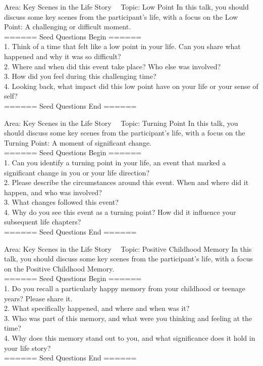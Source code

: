 \begin{mybox}{Area: Key Scenes in the Life Story \ \ Topic: Low Point}
In this talk, you should discuss some key scenes from the participant's life, with a focus on the Low Point: A challenging or difficult moment. \\
====== Seed Questions Begin ====== \\
1. Think of a time that felt like a low point in your life. Can you share what happened and why it was so difficult? \\
2. Where and when did this event take place? Who else was involved? \\
3. How did you feel during this challenging time? \\
4. Looking back, what impact did this low point have on your life or your sense of self? \\
====== Seed Questions End ====== \\
\end{mybox}

\begin{mybox}{Area: Key Scenes in the Life Story \ \ Topic: Turning Point}
In this talk, you should discuss some key scenes from the participant's life, with a focus on the Turning Point: A moment of significant change. \\
====== Seed Questions Begin ====== \\
1. Can you identify a turning point in your life, an event that marked a significant change in you or your life direction? \\
2. Please describe the circumstances around this event. When and where did it happen, and who was involved? \\
3. What changes followed this event? \\
4. Why do you see this event as a turning point? How did it influence your subsequent life chapters? \\
====== Seed Questions End ====== \\
\end{mybox}

\begin{mybox}{Area: Key Scenes in the Life Story \ \ Topic: Positive Childhood Memory}
In this talk, you should discuss some key scenes from the participant's life, with a focus on the Positive Childhood Memory. \\
====== Seed Questions Begin ====== \\
1. Do you recall a particularly happy memory from your childhood or teenage years? Please share it. \\
2. What specifically happened, and where and when was it? \\
3. Who was part of this memory, and what were you thinking and feeling at the time? \\
4. Why does this memory stand out to you, and what significance does it hold in your life story? \\
====== Seed Questions End ====== \\
\end{mybox}

